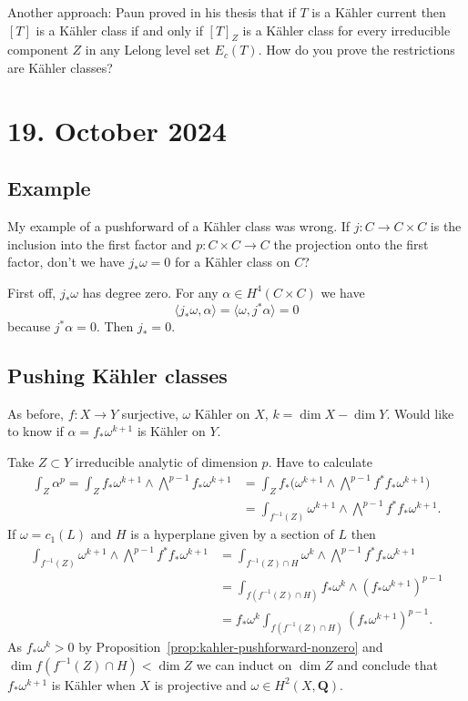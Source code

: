 \documentclass[11pt]{amsart}
\theoremstyle{definition}
\def\QQ{\mathbf{Q}}
\def\<{\langle}
\def\>{\rangle}
\begin{document}
Another approach:
Paun proved in his thesis that if $T$ is a K\"ahler current then $[T]$ is a K\"ahler class if and only if $[T]_Z$ is a K\"ahler class for every irreducible component $Z$ in any Lelong level set $E_c(T)$.
How do you prove the restrictions are K\"ahler classes?




\section{19. October 2024}


\subsection*{Example}

My example of a pushforward of a K\"ahler class was wrong.
If $j : C \to C \times C$ is the inclusion into the first factor and $p : C \times C \to C$ the projection onto the first factor, don't we have $j_* \omega = 0$ for a K\"ahler class on $C$?

First off, $j_*\omega$ has degree zero.
For any $\alpha \in H^4(C \times C)$ we have
\[
\< j_* \omega, \alpha \>
= \< \omega, j^*\alpha \> 
= 0
\]
because $j^*\alpha = 0$.
Then $j_* = 0$.


\subsection*{Pushing K\"ahler classes}

As before, $f : X \to Y$ surjective, $\omega$ K\"ahler on $X$, $k = \dim X - \dim Y$.
Would like to know if $\alpha = f_* \omega^{k+1}$ is K\"ahler on $Y$.

Take $Z \subset Y$ irreducible analytic of dimension $p$.
Have to calculate
\begin{align*}
\int_Z \alpha^p
= \int_Z f_*\omega^{k+1} \wedge \bigwedge^{p-1} f_*\omega^{k+1}
&= \int_Z f_*\biggl( \omega^{k+1} \wedge \bigwedge^{p-1} f^* f_*\omega^{k+1} \biggr)
\\
&= \int_{f^{-1}(Z)} \omega^{k+1} \wedge \bigwedge^{p-1} f^* f_*\omega^{k+1}.
\end{align*}
If $\omega = c_1(L)$ and $H$ is a hyperplane given by a section of $L$ then
\begin{align*}
\int_{f^{-1}(Z)} \omega^{k+1} \wedge \bigwedge^{p-1} f^* f_*\omega^{k+1}
&= \int_{f^{-1}(Z) \cap H} \omega^{k} \wedge \bigwedge^{p-1} f^* f_*\omega^{k+1}
\\
&= \int_{f(f^{-1}(Z) \cap H)} f_* \omega^{k} \wedge  (f_*\omega^{k+1})^{p-1}
\\
&= f_*\omega^{k} \int_{f(f^{-1}(Z) \cap H)} (f_*\omega^{k+1})^{p-1}.
\end{align*}
As $f_* \omega^k > 0$ by Proposition~\ref{prop:kahler-pushforward-nonzero} and $\dim f(f^{-1}(Z) \cap H) < \dim Z$ we can induct on $\dim Z$ and conclude that $f_*\omega^{k+1}$ is K\"ahler when $X$ is projective and $\omega \in H^2(X,\QQ)$.
\end{document}
